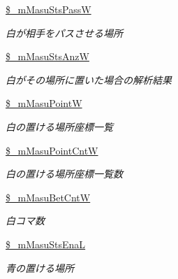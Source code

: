 \begin{DoxyCompactItemize}
\mbox{\label{class_reversi_a3a60b04cc5f54e1196feffc0ec12d89a}} 
\hyperlink{class_reversi_a3a60b04cc5f54e1196feffc0ec12d89a}{\$\+\_\+m\+Masu\+Sts\+PassW}
\begin{DoxyCompactList}\small\item\em 白が相手をパスさせる場所 \end{DoxyCompactList}\item 
\mbox{\label{class_reversi_a8654984ca1ca888a7e2b97e9a2d099aa}} 
\hyperlink{class_reversi_a8654984ca1ca888a7e2b97e9a2d099aa}{\$\+\_\+m\+Masu\+Sts\+AnzW}
\begin{DoxyCompactList}\small\item\em 白がその場所に置いた場合の解析結果 \end{DoxyCompactList}\item 
\mbox{\label{class_reversi_ac6007e0a7a850c31c37eb55ea74746a7}} 
\hyperlink{class_reversi_ac6007e0a7a850c31c37eb55ea74746a7}{\$\+\_\+m\+Masu\+PointW}
\begin{DoxyCompactList}\small\item\em 白の置ける場所座標一覧 \end{DoxyCompactList}\item 
\mbox{\label{class_reversi_aad5f6baed07b96cd5d06e38fd66f1c36}} 
\hyperlink{class_reversi_aad5f6baed07b96cd5d06e38fd66f1c36}{\$\+\_\+m\+Masu\+Point\+CntW}
\begin{DoxyCompactList}\small\item\em 白の置ける場所座標一覧数 \end{DoxyCompactList}\item 
\mbox{\label{class_reversi_a92a21ca9d4bad37593fea8b3d2be6981}} 
\hyperlink{class_reversi_a92a21ca9d4bad37593fea8b3d2be6981}{\$\+\_\+m\+Masu\+Bet\+CntW}
\begin{DoxyCompactList}\small\item\em 白コマ数 \end{DoxyCompactList}\item 
\mbox{\label{class_reversi_a32f836e2f108ab5165927f05cb50977b}} 
\hyperlink{class_reversi_a32f836e2f108ab5165927f05cb50977b}{\$\+\_\+m\+Masu\+Sts\+EnaL}
\begin{DoxyCompactList}\small\item\em 青の置ける場所 \end{DoxyCompactList}\item 

\end{DoxyCompactItemize}
